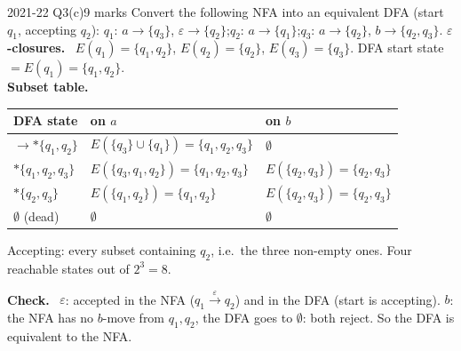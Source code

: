 \documentclass[10.5pt,a4paper]{article}
\newcommand{\ansh}[1]{\textbf{\color{exborder}#1}\ }
\newcommand{\eps}{\varepsilon}
\begin{document}
\begin{examq}{2021-22 Q3(c)}{9 marks}
Convert the following NFA into an equivalent DFA (start $q_1$, accepting $q_2$):\quad
$q_1$: $a\to\{q_3\}$, $\eps\to\{q_2\}$;\quad $q_2$: $a\to\{q_1\}$;\quad $q_3$: $a\to\{q_2\}$, $b\to\{q_2,q_3\}$.
\tcblower
\ansh{$\eps$-closures.} $E(q_1)=\{q_1,q_2\}$, $E(q_2)=\{q_2\}$, $E(q_3)=\{q_3\}$. DFA start state $=E(q_1)=\{q_1,q_2\}$.\\
\ansh{Subset table.}
\begin{center}\small
\begin{tabular}{l|l|l}
DFA state & on $a$ & on $b$\\\hline
$\to *\{q_1,q_2\}$ & $E(\{q_3\}\cup\{q_1\})=\{q_1,q_2,q_3\}$ & $\emptyset$\\
$*\{q_1,q_2,q_3\}$ & $E(\{q_3,q_1,q_2\})=\{q_1,q_2,q_3\}$ & $E(\{q_2,q_3\})=\{q_2,q_3\}$\\
$*\{q_2,q_3\}$ & $E(\{q_1,q_2\})=\{q_1,q_2\}$ & $E(\{q_2,q_3\})=\{q_2,q_3\}$\\
$\emptyset$ (dead) & $\emptyset$ & $\emptyset$
\end{tabular}
\end{center}
Accepting: every subset containing $q_2$, i.e.\ the three non-empty ones. Four reachable states out of $2^3=8$.
\begin{center}
\end{center}
\ansh{Check.} $\eps$: accepted in the NFA ($q_1\xrightarrow{\eps}q_2$) and in the DFA (start is accepting). $b$: the NFA has no $b$-move from
$q_1,q_2$, the DFA goes to $\emptyset$: both reject. So the DFA is equivalent to the NFA.
\end{examq}
\end{document}
